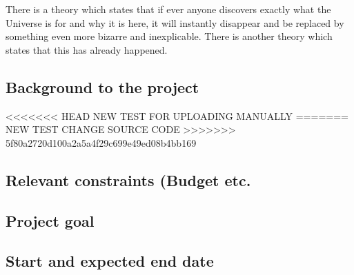 There is a theory which states that if ever anyone discovers exactly what the Universe is for and why it is here, it will instantly disappear and be replaced by something even more bizarre and inexplicable.
There is another theory which states that this has already happened.

\subsection{Background to the project}
<<<<<<< HEAD
NEW TEST FOR UPLOADING MANUALLY
=======
NEW TEST CHANGE SOURCE CODE 
>>>>>>> 5f80a2720d100a2a5a4f29c699e49ed08b4bb169
\subsection{Relevant constraints (Budget etc.}

\subsection{Project goal}

\subsection{Start and expected end date}